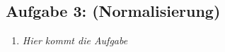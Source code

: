 \subsection{Aufgabe 3: (Normalisierung)}
\label{sec:Aufgabe3}
\begin{enumerate}[label=\alph*)]
    \item \textit{Hier kommt die Aufgabe}
\end{enumerate}